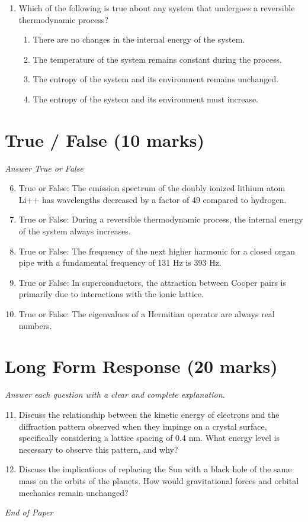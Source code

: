 \documentclass[12pt]{article}
\begin{document}
\begin{enumerate}[label=\arabic*.]
\begin{enumerate}[label=(\alph*)]
\end{enumerate}
\item Which of the following is true about any system that undergoes a reversible thermodynamic process?
\begin{enumerate}[label=(\alph*)]
    \item There are no changes in the internal energy of the system.
    \item The temperature of the system remains constant during the process.
    \item The entropy of the system and its environment remains unchanged.
    \item The entropy of the system and its environment must increase.
\end{enumerate}
\end{enumerate}

\section*{True / False (10 marks)}
\textit{Answer True or False}
\begin{enumerate}[label=\arabic*.]
\setcounter{enumi}{5}
\item True or False: The emission spectrum of the doubly ionized lithium atom Li++ has wavelengths decreased by a factor of 49 compared to hydrogen.
\item True or False: During a reversible thermodynamic process, the internal energy of the system always increases.
\item True or False: The frequency of the next higher harmonic for a closed organ pipe with a fundamental frequency of 131 Hz is 393 Hz.
\item True or False: In superconductors, the attraction between Cooper pairs is primarily due to interactions with the ionic lattice.
\item True or False: The eigenvalues of a Hermitian operator are always real numbers.
\end{enumerate}

\section*{Long Form Response (20 marks)}
\textit{Answer each question with a clear and complete explanation.}
\begin{enumerate}[label=\arabic*.]
\setcounter{enumi}{10}
\item Discuss the relationship between the kinetic energy of electrons and the diffraction pattern observed when they impinge on a crystal surface, specifically considering a lattice spacing of 0.4 nm. What energy level is necessary to observe this pattern, and why?
\item Discuss the implications of replacing the Sun with a black hole of the same mass on the orbits of the planets. How would gravitational forces and orbital mechanics remain unchanged?
\end{enumerate}

\vfill
\noindent\textit{End of Paper}
\end{document}

